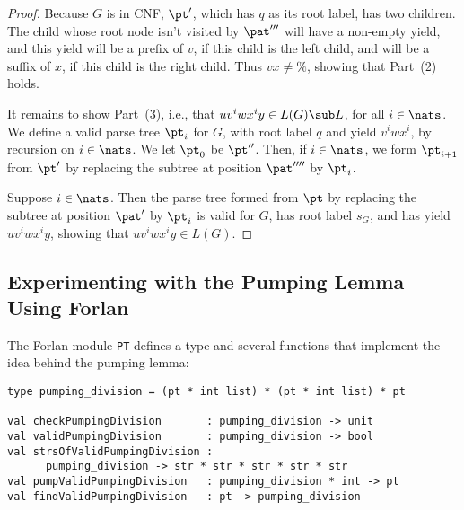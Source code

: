 \begin{proof}
Because $G$ is in CNF, $\pt'$, which has $q$ as its root label, has
two children.  The child whose root node isn't visited by $\pat'''$
will have a non-empty yield, and this yield will be a prefix of $v$,
if this child is the left child, and will be a suffix of $x$, if this
child is the right child.  Thus $vx\neq\%$, showing that Part~(2)
holds.

It remains to show Part~(3), i.e., that $uv^iwx^iy\in L(G)\sub L$, for
all $i\in\nats$.  We define a valid parse tree $\pt_i$ for $G$, with root
label $q$ and yield $v^iwx^i$, by recursion on $i\in\nats$.  We let $\pt_0$ be
$\pt''$.  Then, if $i\in\nats$, we form $\pt_{i+1}$ from $\pt'$ by
replacing the subtree at position $\pat''''$ by $\pt_i$.

Suppose $i\in\nats$.  Then the parse tree formed from $\pt$ by
replacing the subtree at position $\pat'$ by $\pt_i$ is valid for $G$,
has root label $s_G$, and has yield $uv^iwx^iy$, showing that
$uv^iwx^iy\in L(G)$.
\end{proof}

\subsection{Experimenting with the Pumping Lemma Using Forlan}

The Forlan module \texttt{PT} defines a type and several functions
that implement the idea behind the pumping lemma:
\begin{verbatim}
type pumping_division = (pt * int list) * (pt * int list) * pt

val checkPumpingDivision       : pumping_division -> unit
val validPumpingDivision       : pumping_division -> bool
val strsOfValidPumpingDivision :
      pumping_division -> str * str * str * str * str
val pumpValidPumpingDivision   : pumping_division * int -> pt
val findValidPumpingDivision   : pt -> pumping_division
\end{verbatim}

